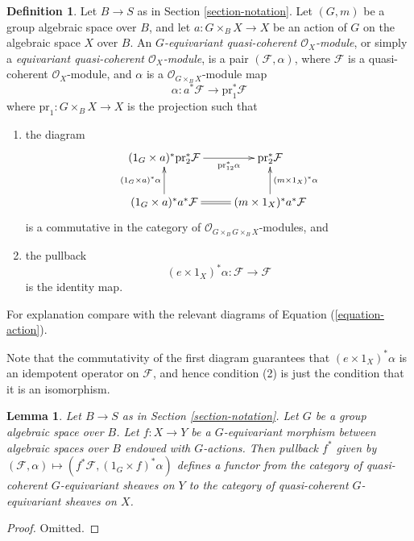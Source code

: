 \documentclass{stacks-project}
\theoremstyle{plain}
\newtheorem{lemma}[subsection]{Lemma}
\theoremstyle{definition}
\newtheorem{definition}[subsection]{Definition}
\theoremstyle{remark}
\numberwithin{equation}{subsection}
\begin{document}
\begin{definition}
\label{definition-equivariant-module}
Let $B \to S$ as in Section \ref{section-notation}.
Let $(G, m)$ be a group algebraic space over $B$, and
let $a : G \times_B X \to X$ be an action of $G$
on the algebraic space $X$ over $B$.
An {\it $G$-equivariant quasi-coherent $\mathcal{O}_X$-module},
or simply a {\it equivariant quasi-coherent $\mathcal{O}_X$-module},
is a pair $(\mathcal{F}, \alpha)$, where $\mathcal{F}$ is a quasi-coherent
$\mathcal{O}_X$-module, and $\alpha$ is a $\mathcal{O}_{G \times_B X}$-module
map
$$
\alpha : a^*\mathcal{F} \longrightarrow \text{pr}_1^*\mathcal{F}
$$
where $\text{pr}_1 : G \times_B X \to X$ is the projection
such that
\begin{enumerate}
\item the diagram
$$
\xymatrix{
(1_G \times a)^*\text{pr}_2^*\mathcal{F} \ar[r]_-{\text{pr}_{12}^*\alpha} &
\text{pr}_2^*\mathcal{F} \\
(1_G \times a)^*a^*\mathcal{F} \ar[u]^{(1_G \times a)^*\alpha} \ar@{=}[r] &
(m \times 1_X)^*a^*\mathcal{F} \ar[u]_{(m \times 1_X)^*\alpha}
}
$$
is a commutative in the category of
$\mathcal{O}_{G \times_B G \times_B X}$-modules, and
\item the pullback
$$
(e \times 1_X)^*\alpha : \mathcal{F} \longrightarrow \mathcal{F}
$$
is the identity map.
\end{enumerate}
For explanation compare with the relevant diagrams of
Equation (\ref{equation-action}).
\end{definition}

\noindent
Note that the commutativity of the first diagram guarantees that
$(e \times 1_X)^*\alpha$ is an idempotent operator on $\mathcal{F}$,
and hence condition (2) is just the condition that it is an isomorphism.

\begin{lemma}
\label{lemma-pullback-equivariant}
Let $B \to S$ as in Section \ref{section-notation}.
Let $G$ be a group algebraic space over $B$.
Let $f : X \to Y$ be a $G$-equivariant morphism between
algebraic spaces over $B$ endowed with $G$-actions.
Then pullback $f^*$ given by
$(\mathcal{F}, \alpha) \mapsto (f^*\mathcal{F}, (1_G \times f)^*\alpha)$
defines a functor from the category of quasi-coherent $G$-equivariant sheaves
on $Y$ to the category of quasi-coherent $G$-equivariant sheaves on $X$.
\end{lemma}

\begin{proof}
Omitted.
\end{proof}
\end{document}
